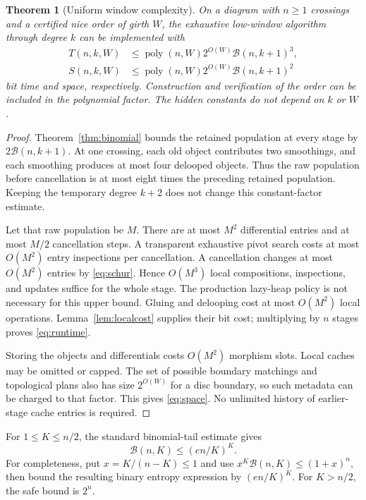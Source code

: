 \documentclass[11pt]{article}
\newtheorem{theorem}{Theorem}[section]
\theoremstyle{definition}\newtheorem{definition}[theorem]{Definition}
\theoremstyle{remark}\newtheorem{remark}[theorem]{Remark}
\newcommand{\B}{\mathcal B}
\begin{document}
\begin{theorem}[Uniform window complexity]\label{thm:runtime}
On a diagram with $n\geq1$ crossings and a certified nice order of girth $W$, the exhaustive low-window algorithm through degree $k$ can be implemented with
\begin{align}
 T(n,k,W)&\leq\operatorname{poly}(n,W)2^{O(W)}\B(n,k+1)^3,
 \label{eq:runtime}\\
 S(n,k,W)&\leq\operatorname{poly}(n,W)2^{O(W)}\B(n,k+1)^2
 \label{eq:space}
\end{align}
bit time and space, respectively. Construction and verification of the order can be included in the polynomial factor. The hidden constants do not depend on $k$ or $W$.
\end{theorem}
\begin{proof}
Theorem~\ref{thm:binomial} bounds the retained population at every stage by $2\B(n,k+1)$. At one crossing, each old object contributes two smoothings, and each smoothing produces at most four delooped objects. Thus the raw population before cancellation is at most eight times the preceding retained population. Keeping the temporary degree $k+2$ does not change this constant-factor estimate.

Let that raw population be $M$. There are at most $M^2$ differential entries and at most $M/2$ cancellation steps. A transparent exhaustive pivot search costs at most $O(M^2)$ entry inspections per cancellation. A cancellation changes at most $O(M^2)$ entries by \eqref{eq:schur}. Hence $O(M^3)$ local compositions, inspections, and updates suffice for the whole stage. The production lazy-heap policy is not necessary for this upper bound. Gluing and delooping cost at most $O(M^2)$ local operations. Lemma~\ref{lem:localcost} supplies their bit cost; multiplying by $n$ stages proves \eqref{eq:runtime}.

Storing the objects and differentials costs $O(M^2)$ morphism slots. Local caches may be omitted or capped. The set of possible boundary matchings and topological plans also has size $2^{O(W)}$ for a disc boundary, so such metadata can be charged to that factor. This gives \eqref{eq:space}. No unlimited history of earlier-stage cache entries is required.
\end{proof}

For $1\leq K\leq n/2$, the standard binomial-tail estimate gives
\begin{equation}
 \B(n,K)\leq (en/K)^K.
 \label{eq:entropy}
\end{equation}
For completeness, put $x=K/(n-K)\leq1$ and use
$x^K\B(n,K)\leq(1+x)^n$, then bound the resulting binary entropy expression by $(en/K)^K$. For $K>n/2$, the safe bound is $2^n$.
\end{document}
